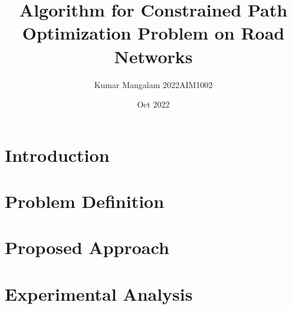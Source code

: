 \documentclass{article}
\title{Algorithm for Constrained Path Optimization Problem on Road Networks}
\author{Kumar Mangalam 2022AIM1002}
\date{Oct 2022}
\begin{document}
\maketitle

\section{Introduction}


\section{Problem Definition}


\section{Proposed Approach}


\section{Experimental Analysis}




\end{document}
